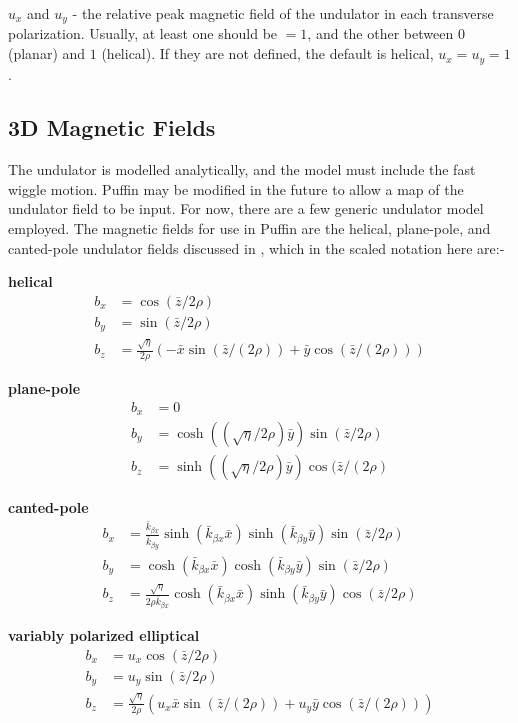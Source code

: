 \documentclass[12pt]{article}%
\begin{document}
$u_x$ and $u_y$ - the relative peak magnetic field of the undulator in each transverse polarization. Usually, at least one should be $=1$, and the other between $0$ (planar) and $1$ (helical). If they are not defined, the default is helical, $u_x=u_y=1$.


\subsection{3D Magnetic Fields}

The undulator is modelled analytically, and the model must include the fast wiggle motion. Puffin may be modified in the future to allow a map of the undulator field to be input. For now, there are a few generic undulator model employed. The magnetic fields for use in Puffin are the helical, plane-pole, and canted-pole undulator fields discussed in \cite{scharlemann1}, which in the scaled notation here are:-

{\bf helical}
\begin{align}
b_x  & = \cos({\bar{z}/2\rho}) \\
b_y & =  \sin({\bar{z}/2\rho}) \\
b_z & = \frac{\sqrt{\eta}}{2\rho} (-\bar{x}\sin({\bar{z} / (2 \rho)}) + \bar{y}\cos({\bar{z} / (2 \rho)}))
\end{align}


{\bf plane-pole}
\begin{align}
b_x  & = 0 \\
b_y & =  \cosh((\sqrt{\eta}/{2\rho}) \bar{y}) \sin({\bar{z}/2\rho}) \\
b_z & =   \sinh((\sqrt{\eta}/{2\rho}) \bar{y}) \cos({\bar{z} / (2 \rho)}
\end{align}




{\bf canted-pole}
\begin{align}
b_x  & =  \frac{\bar{k}_{\beta x}}{\bar{k}_{\beta y}}  \sinh(\bar{k}_{\beta x} \bar{x} )  \sinh(   \bar{k}_{\beta y} \bar{y}    )   \sin({\bar{z}/2\rho}) \label{cp1} \\
b_y & =   \cosh(\bar{k}_{\beta x} \bar{x} )  \cosh(   \bar{k}_{\beta y} \bar{y}    )   \sin({\bar{z}/2\rho}) \label{cp2}\\
b_z & = \frac{\sqrt{\eta}}{2\rho \bar{k}_{\beta x}}     \cosh(\bar{k}_{\beta x} \bar{x} )    \sinh(   \bar{k}_{\beta y} \bar{y}    )    \cos({\bar{z}/2\rho}) \label{cp3}
\end{align}


{\bf variably polarized elliptical}
\begin{align}
b_x  & = u_x \cos({\bar{z}/2\rho}) \\
b_y & =  u_y \sin({\bar{z}/2\rho}) \\
b_z & = \frac{\sqrt{\eta}}{2\rho} (u_x \bar{x}\sin({\bar{z} / (2 \rho)}) + u_y \bar{y}\cos({\bar{z} / (2 \rho)}))
\end{align}
\end{document}
